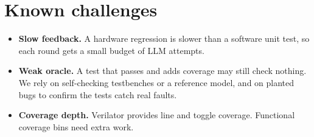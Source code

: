 \documentclass[11pt,a4paper]{article}
\begin{document}
\section{Known challenges}
\begin{itemize}[nosep]
  \item \textbf{Slow feedback.} A hardware regression is slower than a software unit test, so each round gets a small budget of LLM attempts.
  \item \textbf{Weak oracle.} A test that passes and adds coverage may still check nothing. We rely on self-checking testbenches or a reference model, and on planted bugs to confirm the tests catch real faults.
  \item \textbf{Coverage depth.} Verilator provides line and toggle coverage. Functional coverage bins need extra work.
\end{itemize}
\end{document}
